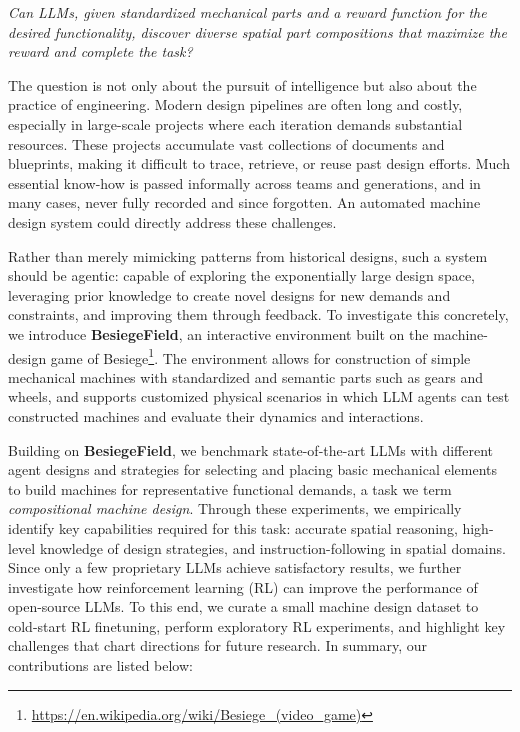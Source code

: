 \documentclass{article} %
\newcommand{\envname}{\textbf{BesiegeField}\xspace}
\theoremstyle{plain}
\theoremstyle{definition}
\begin{document}
\vspace{-1.5mm}
\begin{mdframed}[leftmargin=1em, rightmargin=1em]
\fontsize{9.3pt}{\baselineskip} 
\itshape Can LLMs, given standardized mechanical parts and a reward function for the desired functionality, discover diverse spatial part compositions that maximize the reward and complete the task?
\vspace{-.35mm}
\end{mdframed}
\vspace{-3.75mm}

The question is not only about the pursuit of intelligence but also about the practice of engineering. Modern design pipelines are often long and costly, especially in large-scale projects where each iteration demands substantial resources. These projects accumulate vast collections of documents and blueprints, making it difficult to trace, retrieve, or reuse past design efforts. Much essential know-how is passed informally across teams and generations, and in many cases, never fully recorded and since forgotten. An automated machine design system could directly address these challenges.

Rather than merely mimicking patterns from historical designs, such a system should be agentic: capable of exploring the exponentially large design space, leveraging prior knowledge to create novel designs for new demands and constraints, and improving them through feedback. To investigate this concretely, we introduce \envname, an interactive environment built on the machine-design game of Besiege\footnote{\url{https://en.wikipedia.org/wiki/Besiege_(video_game)}}. The environment 
allows for construction of simple mechanical machines with standardized and semantic parts such as gears and wheels, and
supports customized physical scenarios in which LLM agents can test constructed machines and evaluate their dynamics and interactions.

Building on \envname, we benchmark state-of-the-art LLMs with different agent designs and strategies for selecting and placing basic mechanical elements to build machines for representative functional demands, a task we term \emph{compositional machine design}. Through these experiments, we empirically identify key capabilities required for this task: accurate spatial reasoning, high-level knowledge of design strategies, and instruction-following in spatial domains. Since only a few proprietary LLMs achieve satisfactory results, we further investigate how reinforcement learning (RL) can improve the performance of open-source LLMs. To this end, we curate a small machine design dataset to cold-start RL finetuning, perform exploratory RL experiments, and highlight key challenges that chart directions for future research. In summary, our contributions are listed below:
\end{document}
